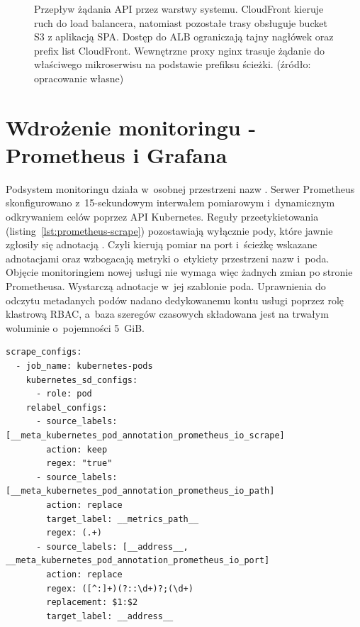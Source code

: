 \begin{figure}[H]

    \caption{Przepływ żądania API przez warstwy systemu. CloudFront kieruje ruch  do load balancera, natomiast pozostałe trasy obsługuje bucket S3 z aplikacją SPA. Dostęp do ALB ograniczają tajny nagłówek  oraz prefix list CloudFront. Wewnętrzne proxy nginx trasuje żądanie do właściwego mikroserwisu na podstawie prefiksu ścieżki. (źródło: opracowanie własne)}
    \label{fig:przeplyw-zadania}
\end{figure}

\section{Wdrożenie monitoringu - Prometheus i Grafana}
\label{sec:wdrozenie-monitoringu}

Podsystem monitoringu działa w~osobnej przestrzeni nazw . Serwer Prometheus skonfigurowano
z~15-sekundowym interwałem pomiarowym i~dynamicznym odkrywaniem celów poprzez API Kubernetes.
Reguły przeetykietowania (listing~\ref{lst:prometheus-scrape}) pozostawiają wyłącznie pody,
które jawnie zgłosiły się adnotacją . Czyli kierują pomiar na port i~ścieżkę wskazane
adnotacjami oraz wzbogacają metryki o~etykiety przestrzeni nazw i~poda. Objęcie monitoringiem nowej usługi nie
wymaga więc żadnych zmian po stronie Prometheusa. Wystarczą adnotacje w~jej szablonie poda. Uprawnienia do
odczytu metadanych podów nadano dedykowanemu kontu usługi poprzez rolę klastrową RBAC, a~baza szeregów czasowych
składowana jest na trwałym woluminie  o~pojemności 5~GiB.

\begin{lstlisting}[caption={Odkrywanie celów pomiarowych na podstawie adnotacji (prometheus.yml)},label={lst:prometheus-scrape}]
scrape_configs:
  - job_name: kubernetes-pods
    kubernetes_sd_configs:
      - role: pod
    relabel_configs:
      - source_labels: [__meta_kubernetes_pod_annotation_prometheus_io_scrape]
        action: keep
        regex: "true"
      - source_labels: [__meta_kubernetes_pod_annotation_prometheus_io_path]
        action: replace
        target_label: __metrics_path__
        regex: (.+)
      - source_labels: [__address__, __meta_kubernetes_pod_annotation_prometheus_io_port]
        action: replace
        regex: ([^:]+)(?::\d+)?;(\d+)
        replacement: $1:$2
        target_label: __address__
\end{lstlisting}

